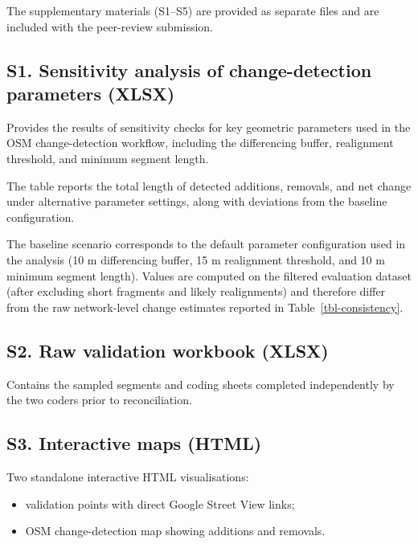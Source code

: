 \documentclass[
]{article}
\providecommand{\tightlist}{%
  \setlength{\itemsep}{0pt}\setlength{\parskip}{0pt}}
\begin{document}
The supplementary materials (S1--S5) are provided as separate files and
are included with the peer-review submission.

\subsection*{S1. Sensitivity analysis of change-detection parameters
(XLSX)}\label{s1-sensitivity}

\color{blue}Provides the results of sensitivity checks for key geometric
parameters used in the OSM change-detection workflow, including the
differencing buffer, realignment threshold, and minimum segment
length.\color{black}

\color{blue}The table reports the total length of detected additions,
removals, and net change under alternative parameter settings, along
with deviations from the baseline configuration.\color{black}

\color{blue}The baseline scenario corresponds to the default parameter
configuration used in the analysis (10 m differencing buffer, 15 m
realignment threshold, and 10 m minimum segment length). Values are
computed on the filtered evaluation dataset (after excluding short
fragments and likely realignments) and therefore differ from the raw
network-level change estimates reported in
Table~\ref{tbl-consistency}.\color{black}

\subsection*{S2. Raw validation workbook (XLSX)}\label{s2-workbook}

Contains the sampled segments and coding sheets completed independently
by the two coders prior to reconciliation.

\subsection*{S3. Interactive maps (HTML)}\label{s3-interactive-maps}

Two standalone interactive HTML visualisations:

\begin{itemize}
\tightlist
\item
  validation points with direct Google Street View links;
\item
  OSM change-detection map showing additions and removals.
\end{itemize}
\end{document}

